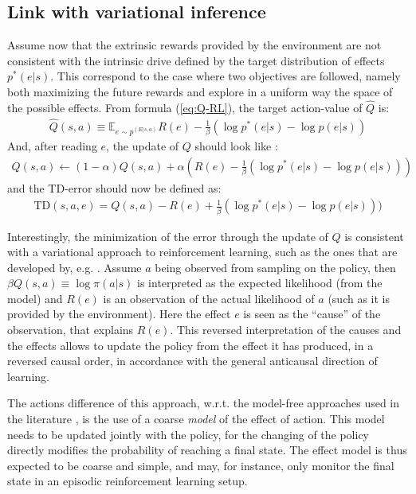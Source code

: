 \documentclass[runningheads]{llncs}
\begin{document}
\subsection*{Link with variational inference}
Assume now that the extrinsic rewards provided by the environment are not consistent with the intrinsic drive defined by the target distribution of effects $p^*(e|s)$. This correspond to the case where two objectives are followed, namely both maximizing the future rewards and explore in a uniform way the space of the possible effects. From formula (\ref{eq:Q-RL}), the target action-value of $\hat{Q}$ is:
\begin{align}
\hat{Q}(s,a) \equiv \mathbb{E}_{e\sim p^(E|s,a)} R(e) - \frac{1}{\beta} (\log p^*(e|s) - \log p(e|s))
\end{align}
And, after reading $e$, the update of $Q$ should look like :
\begin{align}
Q(s,a) \leftarrow (1-\alpha) Q(s,a) + \alpha  (R(e) - \frac{1}{\beta} (\log p^*(e|s) - \log p(e|s)))
\end{align}
and the TD-error should now be defined as:
\begin{align}\label{eq:var-RL}
\text{TD}(s,a,e) = Q(s,a) - R(e) + \frac{1}{\beta} (\log p^*(e|s) - \log p(e|s)))
\end{align}

Interestingly, the minimization of the error through the update of $Q$ is consistent with a variational approach to reinforcement learning, such as the ones that are developed by, e.g. \cite{levine2013guided}.
Assume $a$ being observed from sampling on the policy, then $\beta Q(s,a)\equiv \log \pi(a|s)$ is interpreted as the expected likelihood (from the model) and $R(e)$ is an observation of the actual likelihood of $a$ (such as it is provided by the environment). Here the effect $e$ is seen as the ``cause'' of the observation, that explains $R(e)$. This reversed interpretation of the causes and the effects allows to update the policy from the effect it has produced, in a reversed causal order, in accordance with the general anticausal direction of learning.

The actions difference of this approach, w.r.t. the model-free approaches used in the literature \cite{toussaint2009robot,levine2013guided}, is the use of a coarse \emph{model} of the effect of action. This model needs to be updated jointly with the policy, for the changing of the policy directly modifies the probability of reaching a final state. The effect model is thus expected to be coarse and simple, and may, for instance, only monitor the final state in an episodic reinforcement learning setup. 
\end{document}
